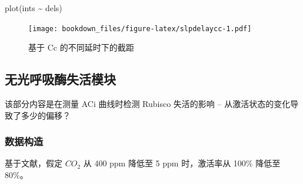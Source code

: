 \documentclass[
]{krantz}
\makeatletter
\newenvironment{Shaded}{\begin{snugshade}}{\end{snugshade}}
\newcommand{\FunctionTok}[1]{\textcolor[rgb]{0.00,0.00,0.00}{#1}}
\newcommand{\NormalTok}[1]{#1}
\newcommand{\SpecialCharTok}[1]{\textcolor[rgb]{0.00,0.00,0.00}{#1}}
\newenvironment{kframe}{%
\medskip{}
\setlength{\fboxsep}{.8em}
 \def\at@end@of@kframe{}%
 \ifinner\ifhmode%
  \def\at@end@of@kframe{\end{minipage}}%
  \begin{minipage}{\columnwidth}%
 \fi\fi%
 \def\FrameCommand##1{\hskip\@totalleftmargin \hskip-\fboxsep
 \colorbox{shadecolor}{##1}\hskip-\fboxsep
     \hskip-\linewidth \hskip-\@totalleftmargin \hskip\columnwidth}%
 \MakeFramed {\advance\hsize-\width
   \@totalleftmargin\z@ \linewidth\hsize
   \@setminipage}}%
 {\par\unskip\endMakeFramed%
 \at@end@of@kframe}
\renewenvironment{Shaded}{\begin{kframe}}{\end{kframe}}
\makeatother
\begin{document}
\begin{Shaded}
\begin{Highlighting}[]
\FunctionTok{plot}\NormalTok{(ints }\SpecialCharTok{\textasciitilde{}}\NormalTok{ dels)}
\end{Highlighting}
\end{Shaded}

\begin{figure}
\centering
\texttt{[image: bookdown\_files/figure-latex/slpdelaycc-1.pdf]}
\caption{\label{fig:slpdelaycc}基于 Cc 的不同延时下的截距}
\end{figure}

\hypertarget{multi7}{%
\subsection{无光呼吸酶失活模块}\label{multi7}}

该部分内容是在测量 ACi 曲线时检测 Rubisco 失活的影响 -- 从激活状态的变化导致了多少的偏移？

\hypertarget{multi8}{%
\subsubsection{数据构造}\label{multi8}}

基于文献，假定 \(CO_2\) 从 400 ppm 降低至 5 ppm 时，激活率从 100\% 降低至 80\%。
\end{document}
